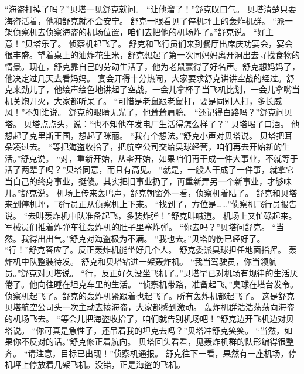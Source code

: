\documentclass[a4paper,12pt,UTF8,twoside]{ctexbook}
\begin{document}
        “海盗打掉了吗？”贝塔一见舒克就问。 
        “让他溜了！”舒克叹口气。 
        贝塔清楚只要海盗活着，他和舒克就不会安宁。 
        舒克一眼看见了停机坪上的轰炸机群。 
        “派一架侦察机去侦察海盗的机场位置，咱们去把他的机场炸了。”舒克说。 
        “好主意！”贝塔乐了。 
        侦察机起飞了。 
        舒克和飞行员们来到餐厅出席庆功宴会，宴会很丰盛。望着桌上的油炸花生米，舒克想起了第一次同妈妈离开洞出去寻找食物的情景。现在，舒克靠自己的劳动生活了，他为老鼠赢得了好名声。舒克想妈妈了，他决定过几天去看妈妈。 
        宴会开得十分热闹，大家要求舒克讲讲空战的经过。舒克来劲儿了，他绘声绘色地讲起了空战，一会儿拿杯子当飞机比划，一会儿拿嘴当机关炮开火，大家都听呆了。 
        “可惜是老鼠跟老鼠打，要是同别人打，多长威风！”不知谁说。 
        舒克的眼睛无光了，他耸耸肩膀。 
        “还记得白路吗？”舒克问贝塔。 
        贝塔点点头，说：“也不知他在发电厂生活得怎么样了？” 
        贝塔喝了口酒。 
        他想起了克里斯王国，想起了咪丽。 
        “我有个想法。”舒克小声对贝塔说。 
        贝塔把耳朵凑过去。 
        “等把海盗收拾了，把航空公司交给臭球经营，咱们再去开始新的生活。”舒克说。 
        “对，重新开始，从零开始，如果咱们再干成一件大事业，不就等于活了两辈子吗？”贝塔同意，而且有高见。 
        “就是，一般人干成了一件事，就拿它当自己的终身事业，挺傻。其实把旧事业扔了，再重新弄另一个新事业，才够味儿。”舒克说。 
        机场上传来轰鸣声，舒克朝窗外一看，侦察机着陆了。 
        舒克和贝塔来到停机坪，飞行员正从侦察机上下来。 
        “找到了，方位是……”侦察机飞行员报告说。 
        “去叫轰炸机中队准备起飞，多装炸弹！”舒克叫喊道。 
        机场上又忙碌起来。军械员们推着炸弹车往轰炸机的肚子里塞炸弹。 
        “你去吗？”贝塔问舒克。 
        “当然。我得出出气。”舒克对海盗极为不满。 
        “我也去。”贝塔的伤已经好了。 
        “行！”舒克答应了。反正轰炸机能坐好几个人。 
        舒克委派臭球担任地面指挥。 
        轰炸机中队整装待发。 
        舒克和贝塔钻进一架轰炸机。 
        “我当驾驶员，你当领航员。”舒克对贝塔说。 
        “行，反正好久没坐飞机了。”贝塔早已对机场有规律的生活厌倦了。他向往睡在坦克车里的生活。 
        “侦察机带路，准备起飞。”臭球在塔台发令。 
        侦察机起飞了。舒克的轰炸机紧跟着也起飞了。所有轰炸机都起飞了。 
        这是舒克贝塔航空公司头一次主动去揍海盗，大家都感到激动。 
        轰炸机群浩浩荡荡向海盗的机场飞去。 
        “等会儿把海盗收拾了，咱们就告别机场吧！”舒克边开飞机边对贝塔说。 
        “你可真是急性子，还吊着我的坦克去吗？”贝塔冲舒克笑笑。 
        “当然，如果你不反对的话。”舒克修正着航向。 
        贝塔回头看看，见轰炸机群的队形编得很整齐。 
        “请注意，目标已出现！”侦察机通报。 
        舒克往下一看，果然有一座机场，停机坪上停放着几架飞机。没错，正是海盗的飞机。 
\end{document}
